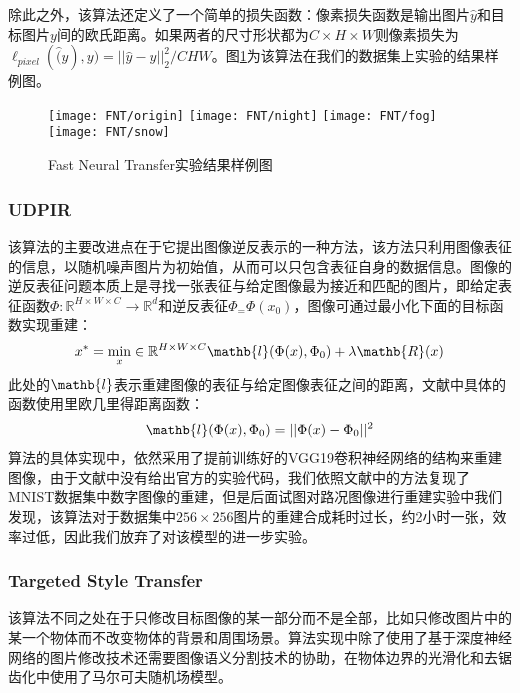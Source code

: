 除此之外，该算法还定义了一个简单的损失函数：像素损失函数是输出图片$\hat{y}$和目标图片$y$间的欧氏距离。如果两者的尺寸形状都为$C\times H\times W$则像素损失为$\ell_{pixel}(\hat(y),y)=||\hat{y}-y||_2^2/CHW$。图\ref{fnt-result}为该算法在我们的数据集上实验的结果样例图。

\begin{figure}[h]
    \centering
    \texttt{[image: FNT/origin]}
    \texttt{[image: FNT/night]}
    \texttt{[image: FNT/fog]}
    \texttt{[image: FNT/snow]}
    \caption{Fast Neural Transfer实验结果样例图}
    \label{fnt-result}
\end{figure}

\subsubsection{UDPIR} 

 该算法的主要改进点在于它提出图像逆反表示的一种方法，该方法只利用图像表征的信息，以随机噪声图片为初始值，从而可以只包含表征自身的数据信息。图像的逆反表征问题本质上是寻找一张表征与给定图像最为接近和匹配的图片，即给定表征函数$\Phi:\mathbb{R}^{H\times W\times C}\to \mathbb{R}^d$和逆反表征$\Phi_=\Phi(x_0)$，图像可通过最小化下面的目标函数实现重建：
\begin{align}
    x^*=\min_x\in \mathbb{R}^{H\times W\times C}\mathb{l}(\Phi(x),\Phi_0)+\lambda\mathb{R}(x)
\end{align}
此处的$\mathb{l}$表示重建图像的表征与给定图像表征之间的距离，文献中具体的函数使用里欧几里得距离函数：
\begin{align}
    \mathb{l}(\Phi(x),\Phi_0)=||\Phi(x)-\Phi_0||^2
\end{align}
算法的具体实现中，依然采用了提前训练好的VGG19卷积神经网络的结构来重建图像，由于文献中没有给出官方的实验代码，我们依照文献中的方法复现了MNIST数据集中数字图像的重建，但是后面试图对路况图像进行重建实验中我们发现，该算法对于数据集中$256\times 256$图片的重建合成耗时过长，约2小时一张，效率过低，因此我们放弃了对该模型的进一步实验。

\subsubsection{Targeted Style Transfer}

 该算法不同之处在于只修改目标图像的某一部分而不是全部，比如只修改图片中的某一个物体而不改变物体的背景和周围场景。算法实现中除了使用了基于深度神经网络的图片修改技术还需要图像语义分割技术的协助，在物体边界的光滑化和去锯齿化中使用了马尔可夫随机场模型。


